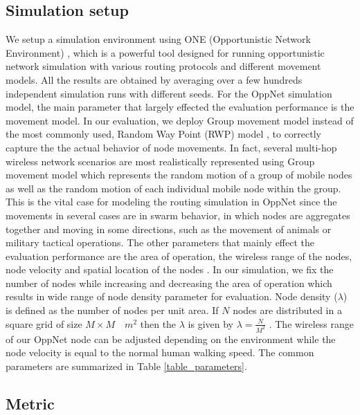 \subsection{Simulation setup}
We setup a simulation environment using ONE (Opportunistic Network Environment) \cite{Keranen2009b}, which is a powerful tool designed for running opportunistic network simulation with various routing protocols and different movement models.
All the results are obtained by averaging over a few hundreds independent simulation runs with different seeds.
For the OppNet simulation model, the main parameter that largely effected the evaluation performance is the movement model.
In our evaluation, we deploy Group movement model instead of the most commonly used, Random Way Point (RWP) model \cite{Batabyal2012}, to correctly capture the the actual behavior of node movements.
In fact, several multi-hop wireless network scenarios are most realistically represented using Group movement model \cite{Blakely2004} which represents the random motion of a group of mobile nodes as well as the random motion of each individual mobile node within the group.
This is the vital case for modeling the routing simulation in OppNet since the movements in several cases are in swarm behavior, in which nodes are aggregates together and moving in some directions, such as the movement of animals or military tactical operations.
The other parameters that mainly effect the evaluation performance are the area of operation, the wireless range of the nodes, node velocity and spatial location of the nodes \cite{Batabyal2012}. 
In our simulation, we fix the number of nodes while increasing and decreasing the area of operation which results in wide range of node density parameter for evaluation.
Node density ($\lambda$) is defined as the number of nodes per unit area. 
If $N$ nodes are distributed in a square grid of size $M \times M \quad{ m }^{ 2 }$ then the $\lambda$ is given by $\lambda =\frac { N }{ { M }^{ 2 } } $ . 
The wireless range of our OppNet node can be adjusted depending on the environment while the node velocity is equal to the normal human walking speed.
The common parameters are summarized in Table \ref{table_parameters}.
\subsection{Metric}

